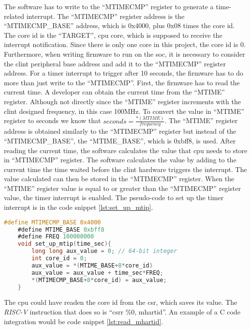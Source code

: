 The software has to write to the \enquote{MTIMECMP} register to generate a time-related interrupt. The \enquote{MTIMECMP} register address is the \enquote{MTIMECMP\_BASE} address, which is 0x4000, plus 0x08 times the core id. The core id is the \enquote{TARGET}, \acrshort{cpu} core, which is supposed to receive the interrupt notification. Since there is only one core in this project, the core id is 0. Furthermore, when writing firmware to run on the \acrshort{soc}, it is necessary to consider the \acrshort{clint} peripheral base address and add it to the \enquote{MTIMECMP} register address. For a timer interrupt to trigger after 10 seconds, the firmware has to do more than just write to the \enquote{MTIMECMP}. First, the firmware has to read the current time. A developer can obtain the current time from the \enquote{MTIME} register. Although not directly since the \enquote{MTIME} register increments with the \acrshort{clint} designed frequency, in this case 100MHz. To convert the value in \enquote{MTIME} register to seconds we know that $seconds=\frac{*(MTIME)}{frequency}$. The \enquote{MTIME} register address is obtained similarly to the \enquote{MTIMECMP} register but instead of the \enquote{MTIMECMP\_BASE}, the \enquote{MTIME\_BASE}, which is 0xbff8, is used. After reading the current time, the software calculates the value that \acrshort{cpu} needs to store in \enquote{MTIMECMP} register. The software calculates the value by adding to the current time the time waited before the \acrshort{clint} hardware triggers the interrupt. The value calculated can then be stored in the \enquote{MTIMECMP} register. When the \enquote{MTIME} register value is equal to or greater than the \enquote{MTIMECMP} register value, the timer interrupt is enabled. The pseudo-code to set up the timer interrupt is in the code snippet \ref*{lst:set_up_mtip}.

\begin{lstlisting}[language=C, caption={Set Up Timer Interrupt.}, label=lst:set_up_mtip]
    #define MTIMECMP_BASE 0x4000
    #define MTIME_BASE 0xbff8
    #define FREQ 100000000
    void set_up_mtip(time_sec){
        long long aux_value = 0; // 64-bit integer
        int core_id = 0;
        aux_value = *(MTIME_BASE+8*core_id)
        aux_value = aux_value + time_sec*FREQ;
        *(MTIMECMP_BASE+8*core_id) = aux_value;
    }
\end{lstlisting}

The \acrshort{cpu} could have readen the core id from the \acrshort{csr}, which saves its value. The \textit{RISC-V} instruction that does so is \enquote{csrr    \%0, mhartid}. An example of a C code integration would be code snippet \ref*{lst:read_mhartid}.

